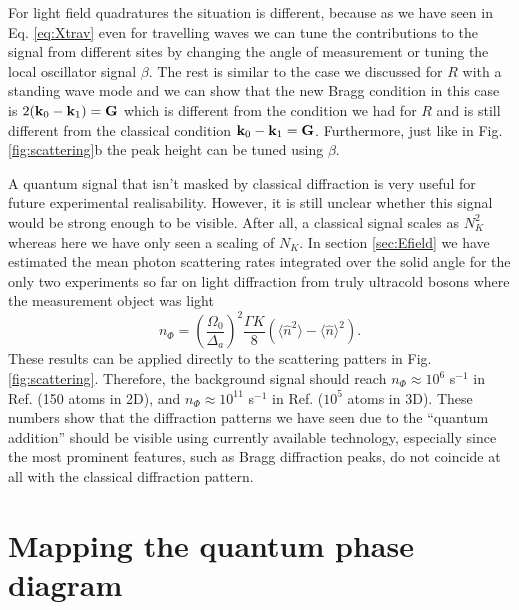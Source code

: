 For light field quadratures the situation is different, because as we
have seen in Eq. \eqref{eq:Xtrav} even for travelling waves we can
tune the contributions to the signal from different sites by changing
the angle of measurement or tuning the local oscillator signal
$\beta$. The rest is similar to the case we discussed for $R$ with a
standing wave mode and we can show that the new Bragg condition in
this case is $2 (\mathbf{k}_0 - \mathbf{k}_1) = \mathbf{G}$ which is different from
the condition we had for $R$ and is still different from the classical
condition $\mathbf{k}_0 - \mathbf{k}_1 = \mathbf{G}$. Furthermore, just like in
Fig. \ref{fig:scattering}b the peak height can be tuned using $\beta$.

A quantum signal that isn't masked by classical diffraction is very
useful for future experimental realisability. However, it is still
unclear whether this signal would be strong enough to be
visible. After all, a classical signal scales as $N_K^2$ whereas here
we have only seen a scaling of $N_K$. In section \ref{sec:Efield} we
have estimated the mean photon scattering rates integrated over the
solid angle for the only two experiments so far on light diffraction
from truly ultracold bosons where the measurement object was light
\begin{equation} 
  n_{\Phi}= \left(\frac{\Omega_0}{\Delta_a}\right)^2 \frac{\Gamma K}{8}
  (\langle\hat{n}^2\rangle-\langle\hat{n}\rangle^2).
\end{equation} 
These results can be applied directly to the scattering patters in
Fig. \ref{fig:scattering}. Therefore, the background signal should
reach $n_\Phi \approx 10^6$ s$^{-1}$ in Ref. \cite{weitenberg2011}
(150 atoms in 2D), and $n_\Phi \approx 10^{11}$ s$^{-1}$ in
Ref. \cite{miyake2011} ($10^5$ atoms in 3D). These numbers show that
the diffraction patterns we have seen due to the ``quantum addition''
should be visible using currently available technology, especially
since the most prominent features, such as Bragg diffraction peaks, do
not coincide at all with the classical diffraction pattern.

\section{Mapping the quantum phase diagram}

